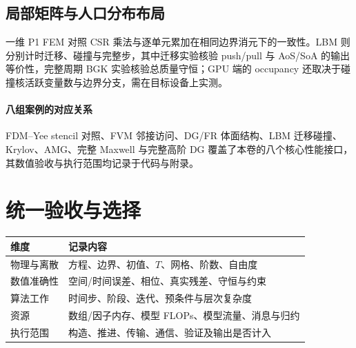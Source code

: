 \subsection{局部矩阵与人口分布布局}
一维 P1 FEM 对照 CSR 乘法与逐单元累加在相同边界消元下的一致性。LBM 则分别计时迁移、碰撞与完整步，其中迁移实验核验 push/pull 与 AoS/SoA 的输出等价性，完整周期 BGK 实验核验总质量守恒；GPU 端的 occupancy 还取决于碰撞核活跃变量数与边界分支，需在目标设备上实测。
\paragraph{八组案例的对应关系}
FDM--Yee stencil 对照、FVM 邻接访问、DG/FR 体面结构、LBM 迁移碰撞、Krylov、AMG、完整 Maxwell 与完整高阶 DG 覆盖了本卷的八个核心性能接口，其数值验收与执行范围均记录于代码与附录。
\section{统一验收与选择}
\begin{center}\small
\begin{tabularx}{\textwidth}{lX}
\toprule 维度&记录内容\\\midrule
物理与离散&方程、边界、初值、$T$、网格、阶数、自由度\\
数值准确性&空间/时间误差、相位、真实残差、守恒与约束\\
算法工作&时间步、阶段、迭代、预条件与层次复杂度\\
资源&数组/因子内存、模型 FLOPs、模型流量、消息与归约\\
执行范围&构造、推进、传输、通信、验证及输出是否计入\\\bottomrule
\end{tabularx}
\end{center}
